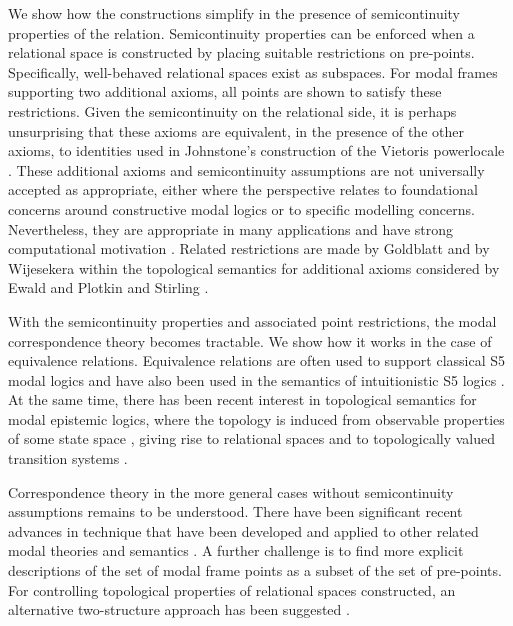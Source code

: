 \documentclass{article}[a4paper]
\theoremstyle{definition}
\begin{document}
We show how the constructions simplify in the presence of semicontinuity properties of the relation. Semicontinuity properties can be enforced when a relational space is constructed by placing suitable restrictions on pre-points. Specifically, well-behaved relational spaces exist as subspaces. For modal frames supporting two additional axioms, all points are shown to satisfy these restrictions. Given the semicontinuity on the relational side, it is perhaps unsurprising that these axioms are equivalent, in the presence of the other axioms, to identities used in Johnstone's  construction of the Vietoris powerlocale \cite{joh82b}.  
These additional axioms and semicontinuity assumptions are not universally accepted as appropriate, either where the perspective relates to foundational concerns around constructive modal logics or to specific modelling concerns. Nevertheless, they are appropriate in many applications and have strong computational motivation \cite{abr91b,plo81,rob86a}.
Related restrictions are made by Goldblatt   \cite{gold76a} and by Wijesekera \cite{wijesekera1990constructive} within the topological semantics for additional axioms considered by Ewald \cite{ewald86} and Plotkin and Stirling \cite{plostir}.

With the semicontinuity properties and associated point restrictions, the modal correspondence theory becomes tractable. We show how it works in the case of equivalence relations. Equivalence relations are often used to support classical S5 modal logics and have also been used in the semantics of intuitionistic S5 logics \cite{simpson94}. At the same time, there has been recent interest in topological semantics for modal epistemic logics, where the topology is induced from observable properties of some state space \cite{baltagVanBenthem2025}, giving rise to relational spaces and to topologically valued transition systems \cite{collinson2026tvts}.

Correspondence theory in the more general cases without semicontinuity assumptions remains to be understood. There have been significant recent advances in technique that have been developed and applied to other related modal theories and semantics \cite{conradie2014unified,zhao2023correspondence}. A further challenge is to find more explicit  descriptions of the set of modal frame points as a subset of the set of pre-points. For controlling topological properties of relational spaces constructed, an alternative two-structure approach has been suggested \cite{collinson2026tvts}.
\end{document}
